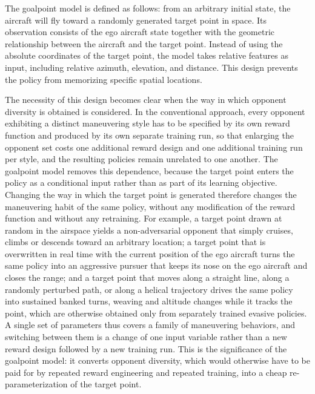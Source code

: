 \documentclass[pdflatex,sn-mathphys-num]{sn-jnl}%
\theoremstyle{thmstyleone}%
\theoremstyle{thmstyletwo}%
\theoremstyle{thmstylethree}%
\begin{document}
The goalpoint model is defined as follows: from an arbitrary initial state, the aircraft will fly toward a randomly generated target point in space. Its observation consists of the ego aircraft state together with the geometric relationship between the aircraft and the target point. Instead of using the absolute coordinates of the target point, the model takes relative features as input, including relative azimuth, elevation, and distance. This design prevents the policy from memorizing specific spatial locations.

The necessity of this design becomes clear when the way in which opponent diversity is obtained is considered. In the conventional approach, every opponent exhibiting a distinct maneuvering style has to be specified by its own reward function and produced by its own separate training run, so that enlarging the opponent set costs one additional reward design and one additional training run per style, and the resulting policies remain unrelated to one another. The goalpoint model removes this dependence, because the target point enters the policy as a conditional input rather than as part of its learning objective. Changing the way in which the target point is generated therefore changes the maneuvering habit of the same policy, without any modification of the reward function and without any retraining. For example, a target point drawn at random in the airspace yields a non-adversarial opponent that simply cruises, climbs or descends toward an arbitrary location; a target point that is overwritten in real time with the current position of the ego aircraft turns the same policy into an aggressive pursuer that keeps its nose on the ego aircraft and closes the range; and a target point that moves along a straight line, along a randomly perturbed path, or along a helical trajectory drives the same policy into sustained banked turns, weaving and altitude changes while it tracks the point, which are otherwise obtained only from separately trained evasive policies. A single set of parameters thus covers a family of maneuvering behaviors, and switching between them is a change of one input variable rather than a new reward design followed by a new training run. This is the significance of the goalpoint model: it converts opponent diversity, which would otherwise have to be paid for by repeated reward engineering and repeated training, into a cheap re-parameterization of the target point.
\end{document}
